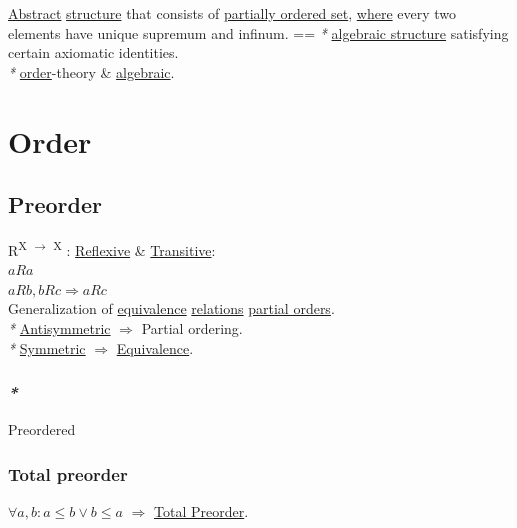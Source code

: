 \documentclass[a4paper,14pt,oneside]{book}
\begin{document}
\hyperref[orgb942bc6]{Abstract} \hyperref[org69a0665]{structure} that consists of \hyperref[org9d3ec4c]{partially ordered set}, \hyperref[org002404a]{where} every two elements have unique supremum and infinum. == \emph{*} \hyperref[org9905577]{algebraic structure} satisfying certain axiomatic identities.\\
\emph{*} \hyperref[org1313c5f]{order}-theory \& \hyperref[orgee35152]{algebraic}.\\

\section{\label{org1313c5f}Order}
\label{sec:orga81630e}

\subsection{\label{org87eab1e}Preorder}
\label{sec:orgfeab460}

R\textsuperscript{X \(\to\) X} : \hyperref[org7d60c20]{Reflexive} \& \hyperref[org0ec6bad]{Transitive}:\\
\(aRa\)\\
\(aRb, bRc \Rightarrow aRc\)\\

Generalization of \hyperref[orga6050b4]{equivalence} \hyperref[orgd960451]{relations} \hyperref[org3d3eb93]{partial orders}.\\

\emph{*} \hyperref[orgc699b09]{Antisymmetric} \(\Rightarrow\) Partial ordering.\\
\emph{*} \hyperref[org23b3c7c]{Symmetric} \(\Rightarrow\) \hyperref[orga6050b4]{Equivalence}.\\

\subsubsection{\emph{*}}
\label{sec:orgfb8f42d}

\label{orgd9bf00e}Preordered\\

\subsubsection{\label{org0ee2e25}Total preorder}
\label{sec:orgb949aeb}

\(\forall a,b : a \le b \lor b \le a\) \(\Rightarrow\) \hyperref[org0ee2e25]{Total Preorder}.\\
\end{document}
